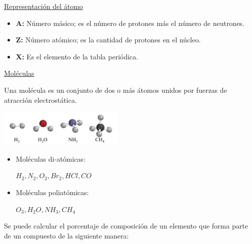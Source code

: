             \begin{center}
                \underline{Representación del átomo} \\[5pt]
            \end{center}

                \begin{itemize}
                    \item \textbf{A:} Número másico; es el número de protones más el número de neutrones.
                    \item \textbf{Z:} Número atómico; es la cantidad de protones en el núcleo.
                    \item \textbf{X:} Es el elemento de la tabla periódica.
                \end{itemize}

            \begin{center} \underline{Moléculas} \end{center}
                \indent Una molécula es un conjunto de dos o más átomos unidos por fuerzas de atracción electrostática.
                \begin{center} \includegraphics[width=6cm]{./imagenes/moleculas.png} \end{center}
                \begin{itemize}
                    \item Moléculas di-atómicas:
                        \begin{center}
                            $H_2, N_2, O_2, Br_2, HCl, CO$
                        \end{center}
                    \item Moléculas poliatómicas:
                        \begin{center}
                            $O_3, H_2O, NH_3, CH_4$
                        \end{center}
                \end{itemize}
                \indent Se puede calcular el porcentaje de composición de un elemento que forma parte de un compuesto de la siguiente manera:
                \begin{center}
                \end{center}

